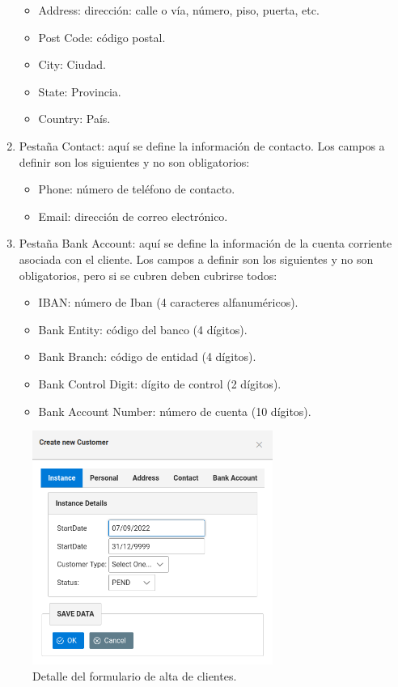 \begin{enumerate}
	\begin{itemize}
	\item Address: dirección: calle o vía, número, piso, puerta, etc.
	\item Post Code: código postal.
	\item City: Ciudad.
	\item State: Provincia.
	\item Country: País.
	\end{itemize}
\item Pestaña Contact: aquí se define la información de contacto. Los campos a definir son los siguientes y no son obligatorios:
	\begin{itemize}
	\item Phone: número de teléfono de contacto.
	\item Email: dirección de correo electrónico.
	\end{itemize}
\item Pestaña Bank Account: aquí se define la información de la cuenta corriente asociada con el cliente. Los campos a definir son los siguientes y no son obligatorios, pero si se cubren deben cubrirse todos:
	\begin{itemize}
	\item IBAN: número de Iban (4 caracteres alfanuméricos).
	\item Bank Entity: código del banco (4 dígitos).
	\item Bank Branch: código de entidad (4 dígitos).
	\item Bank Control Digit: dígito de control (2 dígitos).
	\item Bank Account Number: número de cuenta (10 dígitos).	
	\end{itemize}	
\end{enumerate}


\begin{figure}[H]
  \centering
  \includegraphics[width=0.70\textwidth]{imaxes/formulario-alta-cliente.png}
  \caption{Detalle del formulario de alta de clientes.}
  \label{fig:formulario-alta-cliente}
\end{figure}

